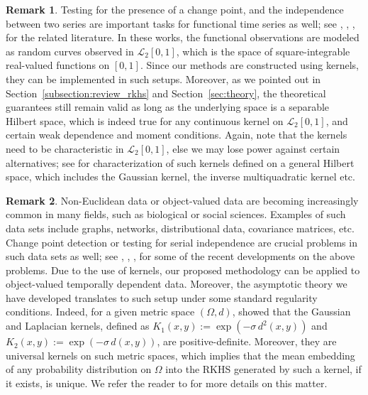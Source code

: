 \documentclass[11pt]{article}
\theoremstyle{plain}
\theoremstyle{definition}
\newtheorem{remark}{Remark}
\theoremstyle{remark}
\begin{document}
    \begin{remark}
        Testing for the presence of a change point, and the  independence between two series are  important tasks for functional time series as well; see \cite{gabrys2007portmanteau}, \cite{zhangshao2011},  \cite{horvath2012inference}, \cite{horvath2015testing} for the related literature. In these works,   the functional observations are modeled as random curves observed in $\mathcal{L}_2[0,1]$, which is the space of square-integrable real-valued functions on $[0,1]$.  Since our methods are constructed using kernels, they can be implemented in such setups. Moreover, as we pointed out 
 in Section~\ref{subsection:review_rkhs} and Section~\ref{sec:theory}, the theoretical guarantees still remain valid as long as the underlying space is a separable Hilbert space, which is indeed true for any continuous kernel on $\mathcal{L}_2[0,1]$, and certain weak dependence and moment  conditions. Again, note that the kernels need to be characteristic in $\mathcal{L}_2[0,1]$, else we may lose power against certain alternatives; see \cite{duncantwosample} for characterization of such kernels defined on a general Hilbert space, which includes the Gaussian kernel, the inverse multiquadratic kernel etc.  
    \end{remark}
    \begin{remark}
        Non-Euclidean data or object-valued data are becoming increasingly common in many fields, such as biological or social sciences. Examples of such data sets include graphs, networks, distributional data, covariance matrices, etc. Change point detection or testing for serial independence are crucial problems in such data sets as well; see \cite{dubey2020frechet}, \cite{dubey2023change}, \cite{jiang2024two}, \cite{jiang2024testing} for some of the recent developments on the above problems. Due to the use of kernels, our proposed methodology can be applied to object-valued temporally dependent data. Moreover, the asymptotic theory we have developed translates to such setup under some standard regularity conditions. Indeed, for a given metric space $(\Omega,d)$, \cite{zhang2024dimension} showed that the Gaussian and Laplacian kernels, defined as $K_1(x,y):=\exp{(-\sigma\,d^2(x,y))}$ and $K_2(x,y):=\exp{(-\sigma\,d(x,y))}$, are positive-definite. Moreover, they are universal kernels on such metric spaces, which implies that the mean embedding of any probability distribution on $\Omega$ into the RKHS generated by such a kernel, if it exists, is unique. We refer the reader to \cite{bhattacharjee2023nonlinear} for more details on this matter. 
    \end{remark}     
\end{document}
